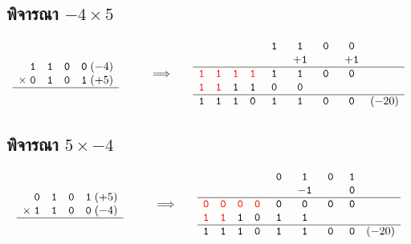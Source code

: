 \documentclass[12pt]{article}
\newcommand{\bit}[1]{\mathtt{#1}}
\newcommand{\rbit}[1]{\textcolor{red}{\mathtt{#1}}}
\newcommand{\coef}[1]{\mathtt{#1}}
\newcommand{\cblank}{\phantom{\coef{+1}}}
\newcommand{\blank}{\phantom{\bit{0}}}
\begin{document}
\subsection{พิจารณา $-4 \times 5$}
\[
\begin{array}{cc@{\qquad\Longrightarrow\qquad}c}
\begin{array}{c@{\;}cccc@{\;}l}
\phantom{\times}&\bit{1}&\bit{1}&\bit{0}&\bit{0}&(-4)\\
\times&\bit{0}&\bit{1}&\bit{0}&\bit{1}&(+5)\\
\hline
\end{array}
& &
\begin{array}{*{8}{c}l}
\blank&\blank&\blank&\blank&\bit{1}&\bit{1}&\bit{0}&\bit{0}&\\
\blank&\blank&\blank&\blank&\cblank&\coef{+1}&\cblank&\coef{+1}&\\
\hline
\rbit{1}&\rbit{1}&\rbit{1}&\rbit{1}&\bit{1}&\bit{1}&\bit{0}&\bit{0}&\\
\rbit{1}&\rbit{1}&\bit{1}&\bit{1}&\bit{0}&\bit{0}&\blank&\blank&\\
\hline
\bit{1}&\bit{1}&\bit{1}&\bit{0}&\bit{1}&\bit{1}&\bit{0}&\bit{0}&(-20)
\end{array}
\end{array}
\]

\subsection{พิจารณา $5 \times -4$}
\[
\begin{array}{cc@{\qquad\Longrightarrow\qquad}c}
\begin{array}{c@{\;}cccc@{\;}l}
\phantom{\times}&\bit{0}&\bit{1}&\bit{0}&\bit{1}&(+5)\\
\times&\bit{1}&\bit{1}&\bit{0}&\bit{0}&(-4)\\
\hline
\end{array}
& &
\begin{array}{*{8}{c}l}
\blank&\blank&\blank&\blank&\bit{0}&\bit{1}&\bit{0}&\bit{1}&\\
\blank&\blank&\blank&\blank&\cblank&\coef{-1}&\cblank&\coef{0}&\\
\hline
\rbit{0}&\rbit{0}&\rbit{0}&\rbit{0}&\bit{0}&\bit{0}&\bit{0}&\bit{0}&\\
\rbit{1}&\rbit{1}&\bit{1}&\bit{0}&\bit{1}&\bit{1}&\blank&\blank&\\
\hline
\bit{1}&\bit{1}&\bit{1}&\bit{0}&\bit{1}&\bit{1}&\bit{0}&\bit{0}&(-20)
\end{array}
\end{array}
\]
\end{document}
